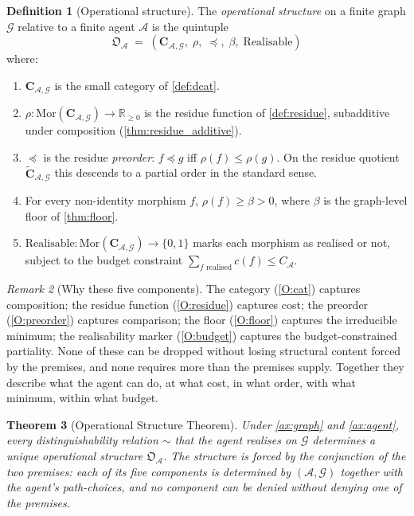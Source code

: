 \documentclass[11pt,a4paper]{article}
\theoremstyle{thmstyle}
\newtheorem{theorem}{Theorem}[section]
\theoremstyle{definition}
\newtheorem{definition}[theorem]{Definition}
\theoremstyle{remark}
\newtheorem{remark}[theorem]{Remark}
\newcommand{\R}{\mathbb{R}}
\newcommand{\Graph}{\mathcal{G}}
\newcommand{\Agent}{\mathcal{A}}
\newcommand{\Res}{\rho}
\newcommand{\floor}{\beta}
\newcommand{\OpStr}{\mathfrak{O}}
\begin{document}
\begin{definition}[Operational structure]
\label{def:opstr}
The \emph{operational structure} on a finite graph $\Graph$
relative to a finite agent $\Agent$ is the quintuple
\[
  \OpStr_\Agent \;=\;
  (\mathbf{C}_{\Agent,\Graph},\; \Res,\; \preceq,\; \floor,\;
  \mathrm{Realisable})
\]
where:
\begin{enumerate}[label=(O\arabic*),leftmargin=2.6em,nosep]
\item\label{O:cat} $\mathbf{C}_{\Agent,\Graph}$ is the small
category of \cref{def:dcat}.
\item\label{O:residue} $\Res: \mathrm{Mor}(\mathbf{C}_{\Agent,
\Graph}) \to \R_{\geq 0}$ is the residue function of
\cref{def:residue}, subadditive under composition
(\cref{thm:residue_additive}).
\item\label{O:preorder} $\preceq$ is the residue \emph{preorder}:
$f \preceq g$ iff $\Res(f) \leq \Res(g)$. On the residue quotient
$\widetilde{\mathbf{C}}_{\Agent,\Graph}$ this descends to a partial
order in the standard sense.
\item\label{O:floor} For every non-identity morphism $f$,
$\Res(f) \geq \floor > 0$, where $\floor$ is the graph-level floor
of \cref{thm:floor}.
\item\label{O:budget} $\mathrm{Realisable}: \mathrm{Mor}(\mathbf{C}_
{\Agent,\Graph}) \to \{0,1\}$ marks each morphism as realised or
not, subject to the budget constraint
$\sum_{f\text{ realised}} c(f) \leq C_\Agent$.
\end{enumerate}
\end{definition}

\begin{remark}[Why these five components]
\label{rem:five}
The category (\ref{O:cat}) captures composition; the residue
function (\ref{O:residue}) captures cost; the preorder
(\ref{O:preorder}) captures comparison; the floor (\ref{O:floor})
captures the irreducible minimum; the realisability marker
(\ref{O:budget}) captures the budget-constrained partiality. None
of these can be dropped without losing structural content forced by
the premises, and none requires more than the premises supply.
Together they describe what the agent can do, at what cost, in what
order, with what minimum, within what budget.
\end{remark}

\begin{theorem}[Operational Structure Theorem]
\label{thm:opstructure}
Under \cref{ax:graph} and \cref{ax:agent}, every distinguishability
relation $\sim$ that the agent realises on $\Graph$ determines a
unique operational structure $\OpStr_\Agent$. The structure is
forced by the conjunction of the two premises: each of its five
components is determined by $(\Agent, \Graph)$ together with the
agent's path-choices, and no component can be denied without
denying one of the premises.
\end{theorem}
\end{document}
